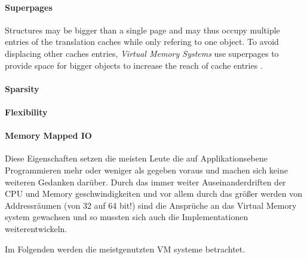 \paragraph{Superpages}
Structures may be bigger than a single page and may thus occupy multiple entries of the translation caches while
only refering to one object. To avoid displacing other caches entries, \textit{Virtual Memory Systems} use
superpages to provide space for bigger objects to increase the reach of cache entries \cite{jacobSoftwaremanagedAddressTranslation1997}.

\paragraph{Sparsity}

\paragraph{Flexibility}
\cite{jacob1998virtualissues} %

\paragraph{Memory Mapped IO}
\cite{tanenbaumOS}



Diese Eigenschaften setzen die meisten Leute die auf Applikationsebene Programmieren mehr oder
weniger als gegeben voraus und machen sich keine weiteren Gedanken darüber.
Durch das immer weiter Auseinanderdriften der CPU und Memory geschwindigkeiten und vor allem
durch das größer werden von Addressräumen (von 32 auf 64 bit!)  sind die Ansprüche an
das Virtual Memory system gewachsen und so mussten sich auch die Implementationen weiterentwickeln.

Im Folgenden werden die meistgenutzten VM systeme betrachtet.



